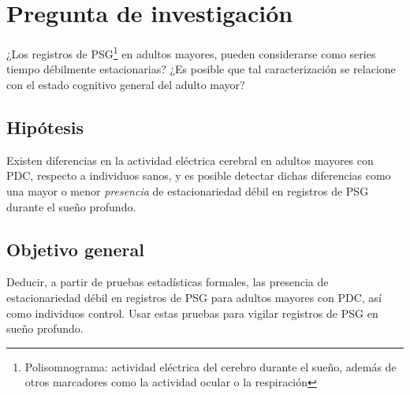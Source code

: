 

\section{Pregunta de investigación}

¿Los registros de PSG\footnote{Polisomnograma: actividad eléctrica del cerebro durante el sueño,
además de otros marcadores como la actividad ocular o la respiración} en adultos mayores, pueden
considerarse como series tiempo débilmente estacionarias?
¿Es posible que tal caracterización se relacione con el estado cognitivo general del adulto mayor?


\subsection{Hipótesis}

Existen diferencias en la actividad eléctrica cerebral en adultos mayores con PDC, respecto
a individuos sanos, y es posible detectar dichas diferencias como una mayor o menor \textit{presencia} 
de estacionariedad débil en registros de PSG durante el sueño profundo.


\subsection{Objetivo general}

Deducir, a partir de pruebas estadísticas formales, las presencia de estacionariedad débil en
registros de PSG para adultos mayores con PDC, así como individuos control.
Usar estas pruebas para vigilar registros de PSG en sueño profundo.



